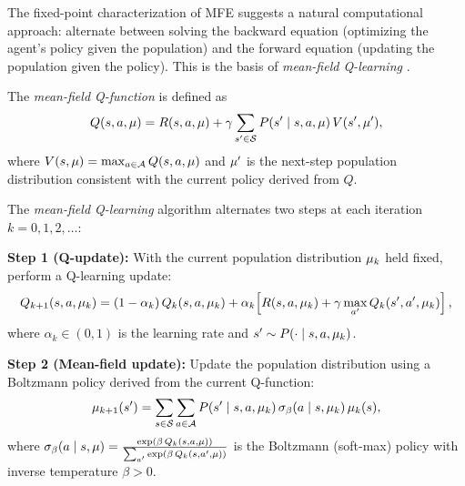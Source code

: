\documentclass[11pt,a4paper]{article}
\begin{document}
The fixed-point characterization of MFE suggests a natural
computational approach: alternate between solving the backward
equation (optimizing the agent's policy given the population) and
the forward equation (updating the population given the policy).
This is the basis of \emph{mean-field Q-learning}
\citep{yang2018}.

\begin{definition}
\label{def:mf-q}
The \emph{mean-field Q-function} is defined as
\begin{equation}
\label{eq:mf-q}
  Q(s, a, \mu) = R(s, a, \mu)
  + \gamma \sum_{s' \in \mathcal{S}}
    P(s' \mid s, a, \mu)\, V(s', \mu'),
\end{equation}
where $V(s, \mu) = \max_{a \in \mathcal{A}} Q(s, a, \mu)$
and $\mu'$ is the next-step population distribution consistent
with the current policy derived from $Q$.
\end{definition}

\begin{definition}
\label{def:mf-q-algorithm}
The \emph{mean-field Q-learning} algorithm alternates two steps at
each iteration $k = 0, 1, 2, \ldots$:

\textbf{Step 1 (Q-update):} With the current population distribution
$\mu_k$ held fixed, perform a Q-learning update:
\begin{equation}
\label{eq:mf-q-update}
  Q_{k+1}(s, a, \mu_k)
  = (1 - \alpha_k)\, Q_k(s, a, \mu_k)
  + \alpha_k \!\left[R(s, a, \mu_k)
    + \gamma \max_{a'} Q_k(s', a', \mu_k)\right],
\end{equation}
where $\alpha_k \in (0,1)$ is the learning rate and $s' \sim
P(\cdot \mid s, a, \mu_k)$.

\textbf{Step 2 (Mean-field update):} Update the population
distribution using a Boltzmann policy derived from the current
Q-function:
\begin{equation}
\label{eq:mf-boltzmann}
  \mu_{k+1}(s') = \sum_{s \in \mathcal{S}}
    \sum_{a \in \mathcal{A}}
    P(s' \mid s, a, \mu_k)\,
    \sigma_\beta(a \mid s, \mu_k)\,
    \mu_k(s),
\end{equation}
where $\sigma_\beta(a \mid s, \mu) =
\frac{\exp(\beta\, Q_k(s, a, \mu))}
{\sum_{a'} \exp(\beta\, Q_k(s, a', \mu))}$
is the Boltzmann (soft-max) policy with inverse temperature
$\beta > 0$.
\end{definition}
\end{document}
